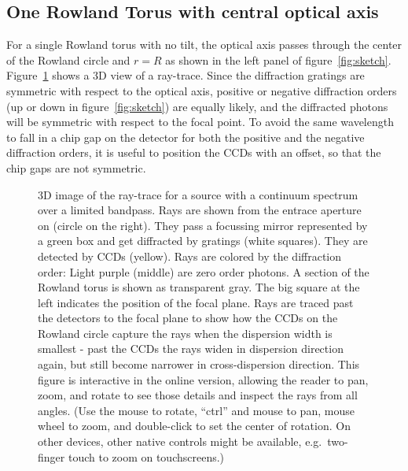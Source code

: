 \documentclass[linenumbers]{aastex631}
\begin{document}
\subsection{One Rowland Torus with central optical axis}
\label{sect:onetorus}
For a single Rowland torus with no tilt, the optical axis passes through the center of the Rowland circle and $r=R$ as shown in the left panel of figure~\ref{fig:sketch}. Figure~\ref{fig:3d:single} shows a 3D view of a ray-trace. Since the diffraction gratings are symmetric with respect to the optical axis, positive or negative diffraction orders (up or down in figure~\ref{fig:sketch}) are equally likely, and the diffracted photons will be symmetric with respect to the focal point. To avoid the same wavelength to fall in a chip gap on the detector for both the positive and the negative diffraction orders, it is useful to position the CCDs with an offset, so that the chip gaps are not symmetric.
\begin{figure}
    \caption{3D image of the ray-trace for a source with a continuum spectrum over a limited bandpass. Rays are shown from the entrace aperture on (circle on the right). They pass a focussing mirror represented by a green box and get diffracted by gratings (white squares). They are detected by CCDs (yellow). Rays are colored by the diffraction order: Light purple (middle) are zero order photons. A section of the Rowland torus is shown as transparent gray. The big square at the left indicates the position of the focal plane. Rays are traced past the detectors to the focal plane to show how the CCDs on the Rowland circle capture the rays when the dispersion width is smallest - past the CCDs the rays widen in dispersion direction again, but still become narrower in cross-dispersion direction. This figure is interactive in the online version, allowing the reader to pan, zoom, and rotate to see those details and inspect the rays from all angles. (Use the mouse to rotate, ``ctrl'' and mouse to pan, mouse wheel to zoom, and double-click to set the center of rotation. On other devices, other native controls might be available, e.g.\ two-finger touch to zoom on touchscreens.)
        }
    \label{fig:3d:single}
\end{figure}
\end{document}
